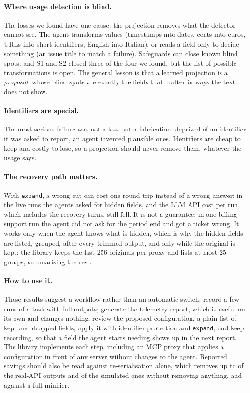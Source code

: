 \paragraph{Where usage detection is blind.} The losses we found have one cause: the projection
removes what the detector cannot see. The agent transforms values (timestamps into dates, cents into euros, URLs
into short identifiers, English into Italian), or reads a field only to decide something (an issue title to match
a failure). Safeguards can close known blind spots, and S1 and S2 closed three of the four we found, but the list of
possible transformations is open. The general lesson is that a learned projection is a \emph{proposal}, whose
blind spots are exactly the fields that matter in ways the text does not show.

\paragraph{Identifiers are special.} The most serious failure was not a loss but a fabrication: deprived of an
identifier it was asked to report, an agent invented plausible ones. Identifiers are cheap to keep and costly to
lose, so a projection should never remove them, whatever the usage says.

\paragraph{The recovery path matters.} With \texttt{expand}, a wrong cut can cost one round trip instead of a wrong
answer: in the live runs the agents asked for hidden fields, and the LLM API cost per run, which includes the recovery
turns, still fell. It is not a
guarantee: in one billing-support run the agent did not ask for the period end and got a ticket wrong. It works only
when the agent knows what is hidden, which is why the hidden fields are listed, grouped, after every trimmed output,
and only while the original is kept: the library keeps the last 256 originals per proxy and lists at most 25 groups,
summarising the rest.

\paragraph{How to use it.} These results suggest a workflow rather than an automatic switch: record a few runs of a
task with full outputs; generate the telemetry report, which is useful on its own and changes nothing; review the
proposed configuration, a plain list of kept and dropped fields; apply it with identifier protection and
\texttt{expand}; and keep recording, so that a field the agent starts needing shows up in the next report. The
library implements each step, including an MCP proxy that applies a configuration in front of any server without
changes to the agent. Reported savings should also be read against re-serialisation alone, which removes up to \ReserialAi{} of the
real-API outputs and \ReserialAiv{} of the simulated ones without removing anything, and against a full minifier.

